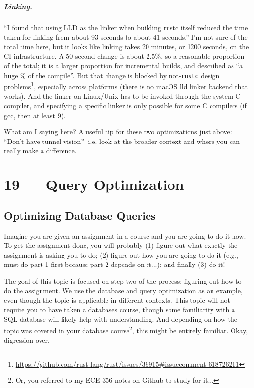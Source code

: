 \documentclass[a4paper]{report}
\begin{document}
\paragraph{Linking.}
``I found that using LLD as the linker when building rustc itself
reduced the time taken for linking from about 93 seconds to about 41
seconds.''  I'm not sure of the total time here, but it looks like
linking takes 20 minutes, or 1200 seconds, on the CI infrastructure. A
50 second change is about 2.5\%, so a reasonable proportion of the
total; it is a larger proportion for incremental builds, and described
as ``a huge \% of the compile''. But that change is blocked by
not-\texttt{rustc} design
problems\footnote{\url{https://github.com/rust-lang/rust/issues/39915\#issuecomment-618726211}},
especially across platforms (there is no macOS lld linker backend that
works).  And the linker on Linux/Unix has to be invoked through the
system C compiler, and specifying a specific linker is only possible
for some C compilers (if gcc, then at least 9).

What am I saying here? A useful tip for these two optimizations just
above: ``Don't have tunnel vision'', i.e. look at the broader context
and where you can really make a difference.









\chapter*{19 --- Query Optimization}


\section*{Optimizing Database Queries}

Imagine you are given an assignment in a course and you are going to do it now. To get the assignment done, you will probably (1) figure out what exactly the assignment is asking you to do; (2) figure out how you are going to do it (e.g., must do part 1 first because part 2 depends on it...); and finally (3) do it! 

The goal of this topic is focused on step two of the process: figuring out how to do the assignment. We use the database and query optimization as an example, even though the topic is applicable in different contexts. This topic will not require you to have taken a databases course, though some familiarity with a SQL database will likely help with understanding. And depending on how the topic was covered in your database course\footnote{Or, you referred to my ECE 356 notes on Github to study for it...}, this might be entirely familiar. Okay, digression over. 
\end{document}
